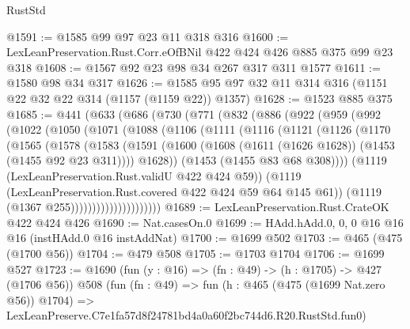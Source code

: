 \begin{lexlean}{RustStd}
\begin{coremodule}
@1591 := @1585 @99 @97 @23 @11 @318 @316
@1600 := LexLeanPreservation.Rust.Corr.eOfBNil @422 @424 @426 @885 @375 @99 @23 @318
@1608 := @1567 @92 @23 @98 @34 @267 @317 @311 @1577
@1611 := @1580 @98 @34 @317
@1626 := @1585 @95 @97 @32 @11 @314 @316 (@1151 @22 @32 @22 @314 (@1157 (@1159 @22)) @1357)
@1628 := @1523 @885 @375
@1685 := @441
    (@633
      (@686
        (@730
          (@771
            (@832
              (@886
                (@922
                  (@959
                    (@992
                      (@1022
                        (@1050
                          (@1071
                            (@1088
                              (@1106
                                (@1111
                                  (@1116
                                    (@1121
                                      (@1126
                                        (@1170
                                          (@1565
                                            (@1578
                                              (@1583
                                                (@1591
                                                  (@1600
                                                    (@1608
                                                      (@1611 (@1626 @1628))
                                                      (@1453 (@1455 @92 @23 @311))))
                                                  @1628))
                                              (@1453 (@1455 @83 @68 @308))))
                                          (@1119 (LexLeanPreservation.Rust.validU @422 @424 @59))
                                          (@1119
                                            (LexLeanPreservation.Rust.covered
                                              @422
                                              @424
                                              @59
                                              @64
                                              @145
                                              @61))
                                          (@1119 (@1367 @255)))))))))))))))))))))
@1689 := LexLeanPreservation.Rust.CrateOK @422 @424 @426
@1690 := Nat.casesOn.{0}
@1699 := HAdd.hAdd.{0, 0, 0} @16 @16 @16 (instHAdd.{0} @16 instAddNat)
@1700 := @1699 @502
@1703 := @465 (@475 (@1700 @56))
@1704 := @479 @508
@1705 := @1703 @1704
@1706 := @1699 @527
@1723 := @1690
    (fun (y : @16) => (fn : @49) -> (h : @1705) -> @427 (@1706 @56))
    @508
    (fun (fn : @49) =>
    fun (h : @465 (@475 (@1699 Nat.zero @56)) @1704) =>
    LexLeanPreserve.C7e1fa57d8f24781bd4a0a60f2bc744d6.R20.RustStd.fun0)

\end{coremodule}
\end{lexlean}
